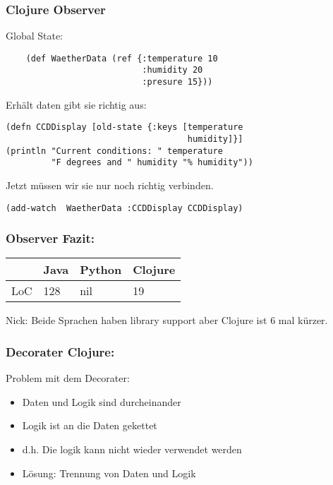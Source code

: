 \documentclass[compress, blue]{beamer}
\begin{document}
\begin{frame}[fragile]\frametitle{Clojure Observer}

Global State:
\pause
  \begin{lstlisting}
    (def WaetherData (ref {:temperature 10 
                           :humidity 20 
                           :presure 15}))
  \end{lstlisting}
\pause
Erhält daten gibt sie richtig aus:
\pause
\begin{lstlisting}
(defn CCDDisplay [old-state {:keys [temperature 
                                    humidity]}]
(println "Current conditions: " temperature 
         "F degrees and " humidity "% humidity"))
\end{lstlisting}
\pause
Jetzt müssen wir sie nur noch richtig verbinden.
\pause
\begin{lstlisting}
(add-watch  WaetherData :CCDDisplay CCDDisplay)
\end{lstlisting}
\end{frame}






\begin{frame}\frametitle{Observer Fazit:}
   \begin{tabular}{l | l l l}
     & Java &  Python & Clojure  \\
     \hline
    LoC & 128 &  nil & 19  \\
   \end{tabular}

  \begin{block}{Nick:}
    Beide Sprachen haben library support aber Clojure ist 6 mal kürzer.
  \end{block}
\end{frame}



\begin{frame}\frametitle{Decorater Clojure:}
  \begin{block}{Problem mit dem Decorater:}
    \begin{itemize}
    \item Daten und Logik sind durcheinander
    \item Logik ist an die Daten gekettet
    \item d.h. Die logik kann nicht wieder verwendet werden
    \item Lösung: Trennung von Daten und Logik
    \end{itemize}
  \end{block}
\end{frame}
\end{document}
